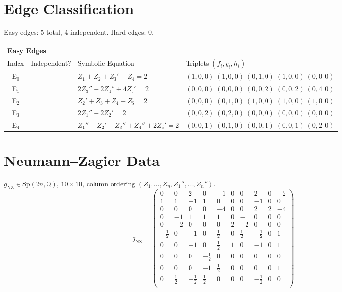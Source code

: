 \documentclass[11pt,a4paper]{article}
\let\oldcheckmark\checkmark
\renewcommand{\checkmark}{\textcolor{pass}{\bfseries\oldcheckmark}}
\begin{document}
\section{Edge Classification}
Easy edges: 5 total, 4 independent. Hard edges: 0.

\begin{longtable}{c c l l}
\toprule
\multicolumn{4}{l}{\textbf{Easy Edges}} \\ \midrule
Index & Independent? & Symbolic Equation & Triplets $(f_i, g_i, h_i)$ \\ \midrule
\endhead
E$_{0}$ & \checkmark & $Z_{1} + Z_{2} + Z_{3}' + Z_{4} = 2$ & $(1,0,0)\;(1,0,0)\;(0,1,0)\;(1,0,0)\;(0,0,0)$ \\
E$_{1}$ & \checkmark & $2Z_{3}'' + 2Z_{4}'' + 4Z_{5}' = 2$ & $(0,0,0)\;(0,0,0)\;(0,0,2)\;(0,0,2)\;(0,4,0)$ \\
E$_{2}$ & \checkmark & $Z_{2}' + Z_{3} + Z_{4} + Z_{5} = 2$ & $(0,0,0)\;(0,1,0)\;(1,0,0)\;(1,0,0)\;(1,0,0)$ \\
E$_{3}$ & \checkmark & $2Z_{1}'' + 2Z_{2}' = 2$ & $(0,0,2)\;(0,2,0)\;(0,0,0)\;(0,0,0)\;(0,0,0)$ \\
E$_{4}$ &  & $Z_{1}'' + Z_{2}' + Z_{3}'' + Z_{4}'' + 2Z_{5}' = 2$ & $(0,0,1)\;(0,1,0)\;(0,0,1)\;(0,0,1)\;(0,2,0)$ \\
\bottomrule
\end{longtable}

\section{Neumann--Zagier Data}
$g_{\text{NZ}} \in \mathrm{Sp}(2n, \mathbb{Q})$, $10 \times 10$, column ordering $(Z_1, \ldots, Z_n, Z_1'', \ldots, Z_n'')$.
{\small
\[
g_{\text{NZ}} = \left(\begin{array}{rrrrrrrrrr}
  0 & 0 & 2 & 0 & -1 & 0 & 0 & 2 & 0 & -2 \\  %
  1 & 1 & -1 & 1 & 0 & 0 & 0 & -1 & 0 & 0 \\  %
  0 & 0 & 0 & 0 & -4 & 0 & 0 & 2 & 2 & -4 \\  %
  0 & -1 & 1 & 1 & 1 & 0 & -1 & 0 & 0 & 0 \\  %
  0 & -2 & 0 & 0 & 0 & 2 & -2 & 0 & 0 & 0 \\  %
  -\tfrac{1}{2} & 0 & -1 & 0 & \tfrac{1}{2} & 0 & \tfrac{1}{2} & -\tfrac{1}{2} & 0 & 1 \\  %
  0 & 0 & -1 & 0 & \tfrac{1}{2} & 1 & 0 & -1 & 0 & 1 \\  %
  0 & 0 & 0 & -\tfrac{1}{2} & 0 & 0 & 0 & 0 & 0 & 0 \\  %
  0 & 0 & 0 & -1 & \tfrac{1}{2} & 0 & 0 & 0 & 0 & 1 \\  %
  0 & \tfrac{1}{2} & -\tfrac{1}{2} & \tfrac{1}{2} & 0 & 0 & 0 & -\tfrac{1}{2} & 0 & 0 \\  %
\end{array}\right)
\]
}
\end{document}
